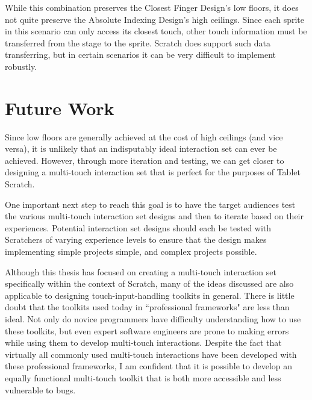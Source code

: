 While this combination preserves the Closest Finger Design's low floors, it does not quite preserve the Absolute Indexing Design's high ceilings. Since each sprite in this scenario can only access its closest touch, other touch information must be transferred from the stage to the sprite. Scratch does support such data transferring, but in certain scenarios it can be very difficult to implement robustly.

\section{Future Work}

Since low floors are generally achieved at the cost of high ceilings (and vice versa), it is unlikely that an indisputably ideal interaction set can ever be achieved. However, through more iteration and testing, we can get closer to designing a multi-touch interaction set that is perfect for the purposes of Tablet Scratch.

One important next step to reach this goal is to have the target audiences test the various multi-touch interaction set designs and then to iterate based on their experiences. Potential interaction set designs should each be tested with Scratchers of varying experience levels to ensure that the design makes implementing simple projects simple, and complex projects possible.

Although this thesis has focused on creating a multi-touch interaction set specifically within the context of Scratch, many of the ideas discussed are also applicable to designing touch-input-handling toolkits in general. There is little doubt that the toolkits used today in ``professional frameworks" are less than ideal. Not only do novice programmers have difficulty understanding how to use these toolkits, but even expert software engineers are prone to making errors while using them to develop multi-touch interactions. Despite the fact that virtually all commonly used multi-touch interactions have been developed with these professional frameworks, I am confident that it is possible to develop an equally functional multi-touch toolkit that is both more accessible and less vulnerable to bugs.

